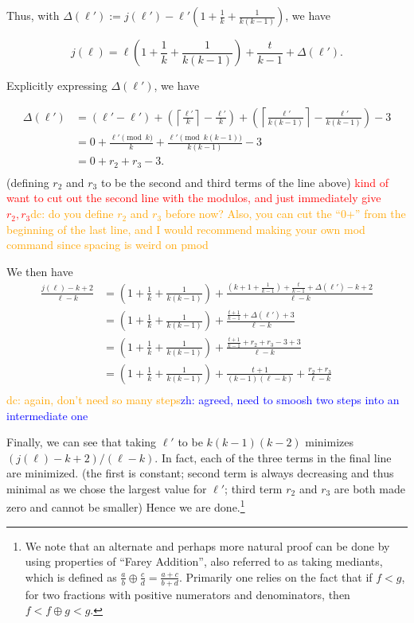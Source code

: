 \documentclass{article}
\theoremstyle{definition}
\newcommand{\edit}[1]{\textcolor{red}{#1}}
\newcommand{\dc}[1]{\textcolor{orange}{dc: #1}}
\newcommand{\zh}[1]{\textcolor{blue}{zh: #1}}
\begin{document}
Thus, with $\Delta(\ell') :=j(\ell')-\ell'\left(1 + \frac{1}{k}+\frac{1}{k(k-1)}\right) $, we have

\[j(\ell) = \ell\left(1 + \frac{1}{k}+\frac{1}{k(k-1)}\right) + \frac{t}{k-1} + \Delta(\ell').\]

Explicitly expressing $\Delta(\ell')$, we have

\begin{align*}
    \Delta(\ell') &= (\ell'-\ell')+\left(\left\lceil\frac{\ell'}{k}\right\rceil -\frac{\ell'}{k}\right)+ \left(\left\lceil\frac{\ell'}{k(k-1)}\right\rceil-\frac{\ell'}{k(k-1)}\right)-3\\
    &= 0 + \frac{\ell' \pmod{k}}{k} +\frac{\ell' \pmod{k(k-1)}}{k(k-1)} -3\\
    &= 0 + r_2 + r_3 -3.\\
\end{align*}(defining $r_2$ and $r_3$ to be the second and third terms of the line above)
\edit{kind of want to cut out the second line with the modulos, and just immediately give $r_2,r_3$}\dc{ do you define $r_2$ and $r_3$ before now? Also, you can cut the ``0+'' from the beginning of the last line, and I would recommend making your own mod command since spacing is weird on pmod} 

\vspace{.75em}

We then have
\begin{align*}
    \frac{j(\ell)-k+2}{\ell-k} &= \left(1 + \frac{1}{k}+\frac{1}{k(k-1)} \right) +\frac{\left(k+1+\frac{1}{k-1}\right) +\frac{t}{k-1} + \Delta(\ell') -k +2}{\ell-k}\\
    &= \left(1 + \frac{1}{k}+\frac{1}{k(k-1)} \right) +\frac{\frac{t+1}{k-1} + \Delta(\ell') +3}{\ell-k}\\
    &= \left(1 + \frac{1}{k}+\frac{1}{k(k-1)} \right) +\frac{\frac{t+1}{k-1} + r_2+r_3-3+3}{\ell-k}\\
    &= \left(1 + \frac{1}{k}+\frac{1}{k(k-1)} \right) +\frac{t+1}{(k-1)(\ell-k)} +\frac{ r_2+r_3}{\ell-k}\\
\end{align*}
\dc{again, don't need so many steps}\zh{ agreed, need to smoosh two steps into an intermediate one}

Finally, we can see that taking $\ell'$ to be $k(k-1)(k-2)$ minimizes $(j(\ell)-k+2)/(\ell-k)$. In fact, each of the three terms in the final line are minimized. (the first is constant; second term is always decreasing and thus minimal as we chose the largest value for $\ell'$; third term $r_2$ and $r_3$ are both made zero and cannot be smaller) Hence we are done.\footnote{We note that an alternate and perhaps more natural proof can be done by using properties of ``Farey Addition'', also referred to as taking mediants, which is defined as $\frac{a}{b}\oplus \frac{c}{d} = \frac{a+c}{b+d}$. Primarily one relies on the fact that if $f < g$, for two fractions with positive numerators and denominators, then $f < f \oplus g < g$.}
\end{document}
